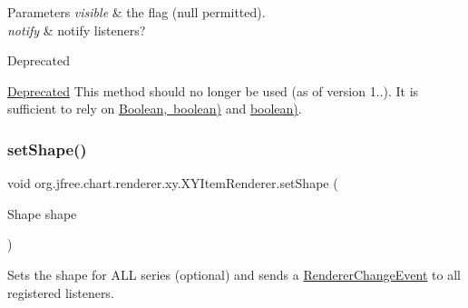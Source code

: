 \begin{DoxyParams}{Parameters}
{\em visible} & the flag ({\ttfamily null} permitted). \\
\hline
{\em notify} & notify listeners?\\
\hline
\end{DoxyParams}
\begin{DoxyRefDesc}{Deprecated}
\item[\mbox{\hyperlink{deprecated__deprecated000218}{Deprecated}}]This method should no longer be used (as of version 1..). It is sufficient to rely on \mbox{\hyperlink{}{Boolean, boolean)}} and \mbox{\hyperlink{interfaceorg_1_1jfree_1_1chart_1_1renderer_1_1xy_1_1_x_y_item_renderer_ada7d9dbe2c39453f0f453cb569f63dde}{boolean)}}. \end{DoxyRefDesc}
\mbox{\label{interfaceorg_1_1jfree_1_1chart_1_1renderer_1_1xy_1_1_x_y_item_renderer_aca76bd279cbe0daa28abee703ce872c7}} 
\subsubsection{\texorpdfstring{set\+Shape()}{setShape()}}
{\footnotesize\ttfamily void org.\+jfree.\+chart.\+renderer.\+xy.\+X\+Y\+Item\+Renderer.\+set\+Shape (\begin{DoxyParamCaption}\item[{Shape}]{shape }\end{DoxyParamCaption})}

Sets the shape for A\+LL series (optional) and sends a \mbox{\hyperlink{}{Renderer\+Change\+Event}} to all registered listeners.


